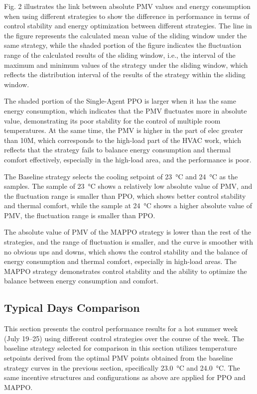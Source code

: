 \documentclass[preprint,12pt]{elsarticle}
\begin{document}
Fig. 2 illustrates the link between absolute PMV values and energy consumption when using different strategies 
to show the difference in performance in terms of control stability and energy optimization between different strategies. 
The line in the figure represents the calculated mean value of the sliding window under the same strategy, 
while the shaded portion of the figure indicates the fluctuation range of the calculated results of the sliding window, 
i.e., the interval of the maximum and minimum values of the strategy under the sliding window, 
which reflects the distribution interval of the results of the strategy within the sliding window. 

The shaded portion of the Single-Agent PPO is larger when it has the same energy consumption, 
which indicates that the PMV fluctuates more in absolute value, demonstrating its poor stability for the control of multiple room temperatures. 
At the same time, the PMV is higher in the part of elec greater than 10M, 
which corresponds to the high-load part of the HVAC work, 
which reflects that the strategy fails to balance energy consumption and thermal comfort effectively, 
especially in the high-load area, and the performance is poor. 

The Baseline strategy selects the cooling setpoint of \SI{23}{\celsius} and \SI{24}{\celsius} as the samples. 
The sample of \SI{23}{\celsius} shows a relatively low absolute value of PMV, and the fluctuation range is smaller than PPO, 
which shows better control stability and thermal comfort, 
while the sample at \SI{24}{\celsius} shows a higher absolute value of PMV, the fluctuation range is smaller than PPO. 

The absolute value of PMV of the MAPPO strategy is lower than the rest of the strategies, 
and the range of fluctuation is smaller, and the curve is smoother with no obvious ups and downs, 
which shows the control stability and the balance of energy consumption and thermal comfort, 
especially in high-load areas. The MAPPO strategy demonstrates control stability 
and the ability to optimize the balance between energy consumption and comfort.


\subsection{Typical Days Comparison}

This section presents the control performance results for a hot summer week (July 19--25) using different control strategies over the course of the week. 
The baseline strategy selected for comparison in this section utilizes temperature setpoints derived from the optimal PMV points obtained from the baseline strategy curves in the previous section, specifically \SI{23.0}{\celsius} and \SI{24.0}{\celsius}. 
The same incentive structures and configurations as above are applied for PPO and MAPPO. 
\end{document}
